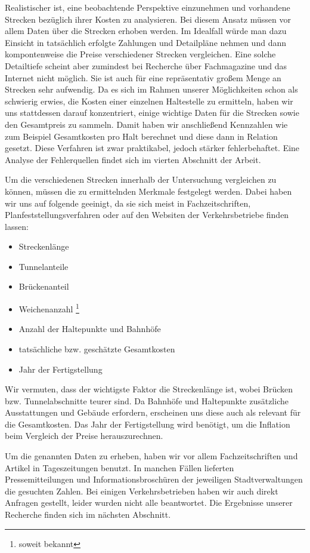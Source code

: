 Realistischer ist, eine beobachtende Perspektive einzunehmen und vorhandene
Strecken bezüglich ihrer Kosten zu analysieren. Bei diesem Ansatz müssen vor
allem Daten über die Strecken erhoben werden. Im Idealfall würde man dazu
Einsicht in tatsächlich erfolgte Zahlungen und Detailpläne nehmen und dann
kompontenweise die Preise verschiedener Strecken vergleichen. Eine solche
Detailtiefe scheint aber zumindest bei Recherche über Fachmagazine und das
Internet nicht möglich. Sie ist auch für eine repräsentativ großem Menge an
Strecken sehr aufwendig. Da es sich im Rahmen unserer Möglichkeiten schon als
schwierig erwies, die Kosten einer einzelnen Haltestelle zu ermitteln, haben
wir uns stattdessen darauf konzentriert, einige wichtige Daten für die Strecken
sowie den Gesamtpreis zu sammeln. Damit haben wir anschließend Kennzahlen wie
zum Beispiel Gesamtkosten pro Halt berechnet und diese dann in Relation
gesetzt. Diese Verfahren ist zwar praktikabel, jedoch stärker fehlerbehaftet. Eine
Analyse der Fehlerquellen findet sich im vierten Abschnitt der Arbeit.

Um die verschiedenen Strecken innerhalb der Untersuchung vergleichen zu können,
müssen die zu ermittelnden Merkmale festgelegt werden. Dabei haben wir uns auf
folgende geeinigt, da sie sich meist in Fachzeitschriften,
Planfeststellungsverfahren oder auf den Websiten der Verkehrsbetriebe finden
lassen:

\begin{itemize}
\item Streckenlänge
\item Tunnelanteile
\item Brückenanteil
\item Weichenanzahl \footnote{soweit bekannt}
\item Anzahl der Haltepunkte und Bahnhöfe
\item tatsächliche bzw. geschätzte Gesamtkosten
\item Jahr der Fertigstellung
\end{itemize}

Wir vermuten, dass der wichtigste Faktor die Streckenlänge ist, wobei Brücken
bzw. Tunnelabschnitte teurer sind. Da Bahnhöfe und Haltepunkte zusätzliche
Ausstattungen und Gebäude erfordern, erscheinen uns diese auch als relevant für
die Gesamtkosten. Das Jahr der Fertigstellung wird benötigt, um die Inflation
beim Vergleich der Preise herauszurechnen.

Um die genannten Daten zu erheben, haben wir vor allem Fachzeitschriften und
Artikel in Tageszeitungen benutzt. In manchen Fällen lieferten Pressemitteilungen
und Informationsbroschüren der jeweiligen Stadtverwaltungen die gesuchten Zahlen.
Bei einigen Verkehrsbetrieben haben wir auch direkt Anfragen gestellt, leider 
wurden nicht alle beantwortet. Die Ergebnisse unserer Recherche finden sich im 
nächsten Abschnitt.

